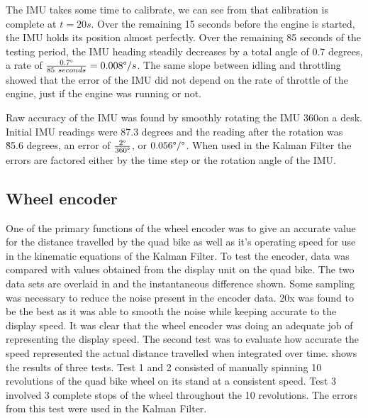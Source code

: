 \documentclass[main.tex]{subfiles}
\begin{document}
The IMU takes some time to calibrate, we can see from  that calibration is complete at $t=20s$. Over the remaining 15 seconds before the engine is started, the IMU holds its position almost perfectly. Over the remaining 85 seconds of the testing period, the IMU heading steadily decreases by a total angle of 0.7 degrees, a rate of $\frac{0.7\degree}{85\ seconds} = 0.008 \degree/s$. The same slope between idling and throttling showed that the error of the IMU did not depend on the rate of throttle of the engine, just if the engine was running or not.

Raw accuracy of the IMU was found by smoothly rotating the IMU 360\degree on a desk. Initial IMU readings were 87.3 degrees and the reading after the rotation was \~85.6 degrees, an error of $\frac{2\degree}{360\degree}$, or $0.056\degree/\degree$. When used in the Kalman Filter the errors are factored either by the time step or the rotation angle of the IMU.

\subsection{Wheel encoder}
One of the primary functions of the wheel encoder was to give an accurate value for the distance travelled by the quad bike as well as it's operating speed for use in the kinematic equations of the Kalman Filter. To test the encoder, data was compared with values obtained from the display unit on the quad bike. The two data sets are overlaid in  and the instantaneous difference shown. Some sampling was necessary to reduce the noise present in the encoder data. 20x was found to be the best as it was able to smooth the noise while keeping accurate to the display speed. It was clear that the wheel encoder was doing an adequate job of representing the display speed. The second test was to evaluate how accurate the speed represented the actual distance travelled when integrated over time.  shows the results of three tests. Test 1 and 2 consisted of manually spinning 10 revolutions of the quad bike wheel on its stand at a consistent speed. Test 3 involved 3 complete stops of the wheel throughout the 10 revolutions. The errors from this test were used in the Kalman Filter.
\end{document}
